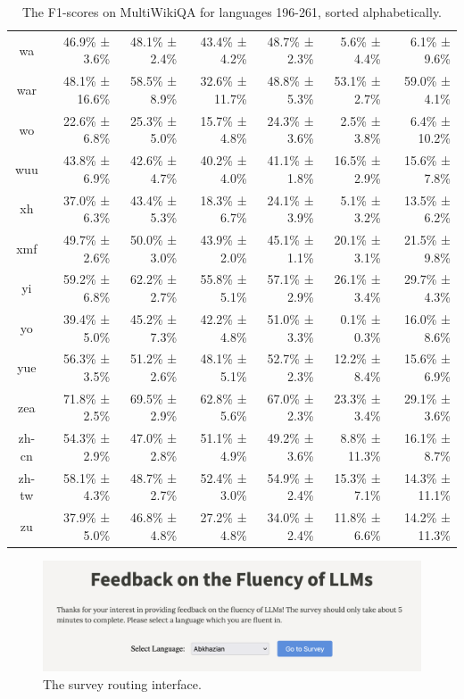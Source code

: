 \documentclass[10pt, a4paper]{article}
\begin{document}
\begin{table}[h]
\begin{tabular}{crrrrrr}
wa & 46.9\% ± 3.6\% & 48.1\% ± 2.4\% & 43.4\% ± 4.2\% & 48.7\% ± 2.3\% & 5.6\% ± 4.4\% & 6.1\% ± 9.6\% \\
war & 48.1\% ± 16.6\% & 58.5\% ± 8.9\% & 32.6\% ± 11.7\% & 48.8\% ± 5.3\% & 53.1\% ± 2.7\% & 59.0\% ± 4.1\% \\
wo & 22.6\% ± 6.8\% & 25.3\% ± 5.0\% & 15.7\% ± 4.8\% & 24.3\% ± 3.6\% & 2.5\% ± 3.8\% & 6.4\% ± 10.2\% \\
wuu & 43.8\% ± 6.9\% & 42.6\% ± 4.7\% & 40.2\% ± 4.0\% & 41.1\% ± 1.8\% & 16.5\% ± 2.9\% & 15.6\% ± 7.8\% \\
xh & 37.0\% ± 6.3\% & 43.4\% ± 5.3\% & 18.3\% ± 6.7\% & 24.1\% ± 3.9\% & 5.1\% ± 3.2\% & 13.5\% ± 6.2\% \\
xmf & 49.7\% ± 2.6\% & 50.0\% ± 3.0\% & 43.9\% ± 2.0\% & 45.1\% ± 1.1\% & 20.1\% ± 3.1\% & 21.5\% ± 9.8\% \\
yi & 59.2\% ± 6.8\% & 62.2\% ± 2.7\% & 55.8\% ± 5.1\% & 57.1\% ± 2.9\% & 26.1\% ± 3.4\% & 29.7\% ± 4.3\% \\
yo & 39.4\% ± 5.0\% & 45.2\% ± 7.3\% & 42.2\% ± 4.8\% & 51.0\% ± 3.3\% & 0.1\% ± 0.3\% & 16.0\% ± 8.6\% \\
yue & 56.3\% ± 3.5\% & 51.2\% ± 2.6\% & 48.1\% ± 5.1\% & 52.7\% ± 2.3\% & 12.2\% ± 8.4\% & 15.6\% ± 6.9\% \\
zea & 71.8\% ± 2.5\% & 69.5\% ± 2.9\% & 62.8\% ± 5.6\% & 67.0\% ± 2.3\% & 23.3\% ± 3.4\% & 29.1\% ± 3.6\% \\
zh-cn & 54.3\% ± 2.9\% & 47.0\% ± 2.8\% & 51.1\% ± 4.9\% & 49.2\% ± 3.6\% & 8.8\% ± 11.3\% & 16.1\% ± 8.7\% \\
zh-tw & 58.1\% ± 4.3\% & 48.7\% ± 2.7\% & 52.4\% ± 3.0\% & 54.9\% ± 2.4\% & 15.3\% ± 7.1\% & 14.3\% ± 11.1\% \\
zu & 37.9\% ± 5.0\% & 46.8\% ± 4.8\% & 27.2\% ± 4.8\% & 34.0\% ± 2.4\% & 11.8\% ± 6.6\% & 14.2\% ± 11.3\% \\
\bottomrule
\end{tabular}
\caption{The F1-scores on MultiWikiQA for languages 196-261, sorted alphabetically.}
\label{tab:num-samples-in-small-subsets}
\end{table}


\begin{figure}
    \centering
    \includegraphics[width=1.0\linewidth]{routing-interface.png}
    \caption{The survey routing interface.}
    \label{fig:routing-interface}
\end{figure}
\end{document}
